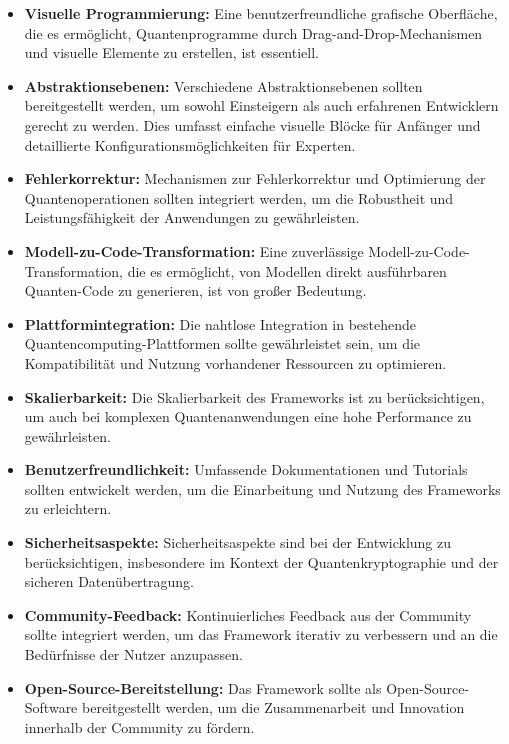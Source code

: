 \begin{itemize}
    \item \textbf{Visuelle Programmierung:} Eine benutzerfreundliche grafische Oberfläche, die es ermöglicht, Quantenprogramme 
    durch Drag-and-Drop-Mechanismen und visuelle Elemente zu erstellen, ist essentiell.
    \item \textbf{Abstraktionsebenen:} Verschiedene Abstraktionsebenen sollten bereitgestellt werden, um sowohl Einsteigern 
    als auch erfahrenen Entwicklern gerecht zu werden. Dies umfasst einfache visuelle Blöcke für Anfänger und detaillierte Konfigurationsmöglichkeiten für Experten.
    \item \textbf{Fehlerkorrektur:} Mechanismen zur Fehlerkorrektur und Optimierung der Quantenoperationen sollten integriert 
    werden, um die Robustheit und Leistungsfähigkeit der Anwendungen zu gewährleisten.
    \item \textbf{Modell-zu-Code-Transformation:} Eine zuverlässige Modell-zu-Code-Transformation, die es ermöglicht, von Modellen 
    direkt ausführbaren Quanten-Code zu generieren, ist von großer Bedeutung.
    \item \textbf{Plattformintegration:} Die nahtlose Integration in bestehende Quantencomputing-Plattformen sollte gewährleistet 
    sein, um die Kompatibilität und Nutzung vorhandener Ressourcen zu optimieren.
    \item \textbf{Skalierbarkeit:} Die Skalierbarkeit des Frameworks ist zu berücksichtigen, um auch bei komplexen Quantenanwendungen 
    eine hohe Performance zu gewährleisten.
    \item \textbf{Benutzerfreundlichkeit:} Umfassende Dokumentationen und Tutorials sollten entwickelt werden, um die Einarbeitung und 
    Nutzung des Frameworks zu erleichtern.
    \item \textbf{Sicherheitsaspekte:} Sicherheitsaspekte sind bei der Entwicklung zu berücksichtigen, insbesondere im Kontext der 
    Quantenkryptographie und der sicheren Datenübertragung.
    \item \textbf{Community-Feedback:} Kontinuierliches Feedback aus der Community sollte integriert werden, um das Framework iterativ 
    zu verbessern und an die Bedürfnisse der Nutzer anzupassen.
    \item \textbf{Open-Source-Bereitstellung:} Das Framework sollte als Open-Source-Software bereitgestellt werden, um die 
    Zusammenarbeit und Innovation innerhalb der Community zu fördern.
\end{itemize}

